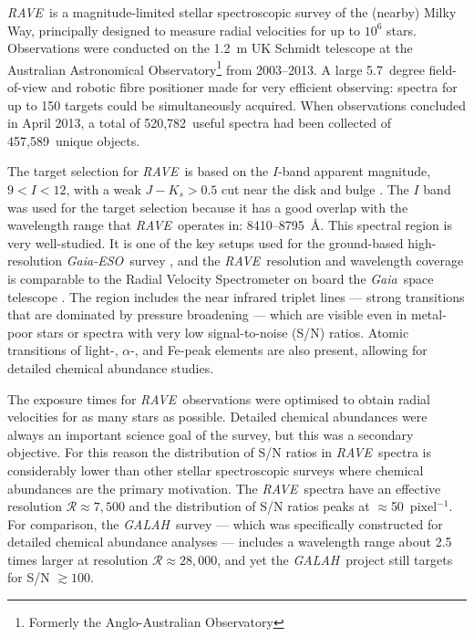 \documentclass[preprint,trackchanges]{aastex}
\newcommand{\acronym}[1]{{\small{#1}}}
\newcommand{\project}[1]{\textsl{#1}}
\newcommand{\gaia}{\project{Gaia}}
\newcommand{\rave}{\project{\acronym{RAVE}}}
\newcommand{\galah}{\project{\acronym{GALAH}}}
\newcommand{\ges}{\project{Gaia-ESO}}
\newcommand{\Nspectra}{520,782}
\newcommand{\Nstars}{457,589}
\begin{document}
\rave\ is a magnitude-limited stellar spectroscopic survey of the (nearby) Milky Way,
principally designed to measure radial velocities for up to $10^6$ stars.
Observations were conducted on the 1.2~m UK Schmidt telescope at the Australian 
Astronomical Observatory\footnote{Formerly the Anglo-Australian Observatory} from 
2003--2013.  A large 5.7~degree field-of-view and robotic fibre positioner made for 
very efficient observing:  spectra for up to 150 targets could be simultaneously
acquired.  When observations concluded in April 2013, a total of \Nspectra\ useful 
spectra had been collected of \Nstars\ unique objects. 


The target selection for \rave\ is based on the $I$-band apparent magnitude,
$9 < I < 12$, with a weak $J - K_s > 0.5$ cut near the disk and bulge \citep{Wojno_2016}.  
The $I$ band was used for the target selection because it has a good overlap with the
wavelength range that \rave\ operates in:  8410--8795~\AA.  This spectral region 
is very well-studied.  It is one of the key setups used for the ground-based 
high-resolution \ges\ survey \citep{Gilmore_2012,Randich_2013}, and the 
\rave\ resolution and wavelength coverage is comparable to the Radial Velocity 
Spectrometer on board the \gaia\ space telescope \citep{Kordopatis_2011,Recio-Blanco_2016}.  
The region includes the  near infrared triplet lines --- strong 
transitions that are dominated by pressure broadening --- which are visible even 
in metal-poor stars or spectra with very low signal-to-noise (S/N) ratios.
Atomic transitions of 
light-, $\alpha$-, and Fe-peak elements are also present, allowing for detailed 
chemical abundance studies.


The exposure times for \rave\ observations were optimised to obtain radial 
velocities for as many stars as possible.  Detailed chemical abundances were
always an important science goal of the survey, but this was a secondary objective.  
For this reason the distribution of S/N ratios in \rave\ spectra is considerably 
lower than other stellar spectroscopic surveys where chemical abundances are the 
primary motivation.  The \rave\ spectra have an effective resolution 
$\mathcal{R} \approx 7{,}500$ and the distribution of S/N ratios peaks at 
$\approx$50~pixel$^{-1}$.  For comparison, the \galah\ survey 
\citep{DeSilva_2015} --- which was specifically constructed for detailed chemical 
abundance analyses --- includes a wavelength range about 2.5 times larger at 
resolution $\mathcal{R} \approx 28{,}000$, and yet the \galah\ project still 
targets for S/N $\gtrsim100$.
\end{document}
